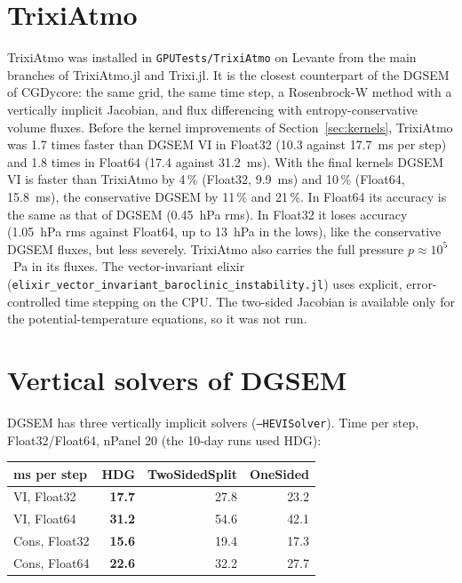 \documentclass[11pt,a4paper]{article}
\newcommand{\code}[1]{\texttt{#1}}
\begin{document}
\section{TrixiAtmo}

TrixiAtmo was installed in \code{GPUTests/TrixiAtmo} on Levante from the
main branches of TrixiAtmo.jl and Trixi.jl. It is the closest
counterpart of the DGSEM of CGDycore: the same grid, the same time step,
a Rosenbrock-W method with a vertically implicit Jacobian, and flux
differencing with entropy-conservative volume fluxes. Before the kernel
improvements of Section~\ref{sec:kernels}, TrixiAtmo was 1.7 times faster
than DGSEM VI in Float32 (10.3 against 17.7~ms per step) and 1.8 times in
Float64 (17.4 against 31.2~ms). With the final kernels DGSEM VI is faster
than TrixiAtmo by 4\,\% (Float32, 9.9~ms) and 10\,\% (Float64, 15.8~ms),
the conservative DGSEM by 11\,\% and 21\,\%. In Float64 its accuracy is the same as that of DGSEM
(0.45~hPa rms). In Float32 it loses accuracy (1.05~hPa rms
against Float64, up to 13~hPa in the lows), like the conservative DGSEM
fluxes, but less severely. TrixiAtmo also carries the full pressure
$p\approx10^5$~Pa in its fluxes. The vector-invariant elixir
(\code{elixir\_vector\_invariant\_baroclinic\_instability.jl}) uses explicit,
error-controlled time stepping on the CPU. The two-sided Jacobian is
available only for the potential-temperature equations, so it was not
run.

\section{Vertical solvers of DGSEM}

DGSEM has three vertically implicit solvers (\code{--HEVISolver}). Time
per step, Float32/Float64, nPanel 20 (the 10-day runs used HDG):

\begin{center}
\small
\begin{tabular}{lrrr}
\toprule
ms per step & HDG & TwoSidedSplit & OneSided \\
\midrule
VI, Float32   & \textbf{17.7} & 27.8 & 23.2 \\
VI, Float64   & \textbf{31.2} & 54.6 & 42.1 \\
Cons, Float32 & \textbf{15.6} & 19.4 & 17.3 \\
Cons, Float64 & \textbf{22.6} & 32.2 & 27.7 \\
\bottomrule
\end{tabular}
\end{center}
\end{document}
